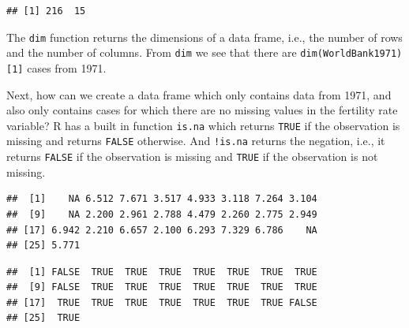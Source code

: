 \documentclass[
]{krantz}
\newenvironment{Shaded}{\begin{snugshade}}{\end{snugshade}}
\newcommand{\DecValTok}[1]{\textcolor[rgb]{0.00,0.00,0.81}{#1}}
\newcommand{\KeywordTok}[1]{\textcolor[rgb]{0.13,0.29,0.53}{\textbf{#1}}}
\newcommand{\NormalTok}[1]{#1}
\newcommand{\OperatorTok}[1]{\textcolor[rgb]{0.81,0.36,0.00}{\textbf{#1}}}
\newcommand{\StringTok}[1]{\textcolor[rgb]{0.31,0.60,0.02}{#1}}
\begin{document}
\begin{Shaded}
\end{Shaded}

\begin{verbatim}
## [1] 216  15
\end{verbatim}

The \texttt{dim} function returns the dimensions of a data frame, i.e., the number of rows and the number of columns. From \texttt{dim} we see that there are \texttt{dim(WorldBank1971){[}1{]}} cases from 1971.

Next, how can we create a data frame which only contains data from 1971, and also only contains cases for which there are no missing values in the fertility rate variable? R has a built in function \texttt{is.na} which returns \texttt{TRUE} if the observation is missing and returns \texttt{FALSE} otherwise. And \texttt{!is.na} returns the negation, i.e., it returns \texttt{FALSE} if the observation is missing and \texttt{TRUE} if the observation is not missing.

\begin{Shaded}
\end{Shaded}

\begin{verbatim}
##  [1]    NA 6.512 7.671 3.517 4.933 3.118 7.264 3.104
##  [9]    NA 2.200 2.961 2.788 4.479 2.260 2.775 2.949
## [17] 6.942 2.210 6.657 2.100 6.293 7.329 6.786    NA
## [25] 5.771
\end{verbatim}

\begin{Shaded}
\end{Shaded}

\begin{verbatim}
##  [1] FALSE  TRUE  TRUE  TRUE  TRUE  TRUE  TRUE  TRUE
##  [9] FALSE  TRUE  TRUE  TRUE  TRUE  TRUE  TRUE  TRUE
## [17]  TRUE  TRUE  TRUE  TRUE  TRUE  TRUE  TRUE FALSE
## [25]  TRUE
\end{verbatim}
\end{document}
